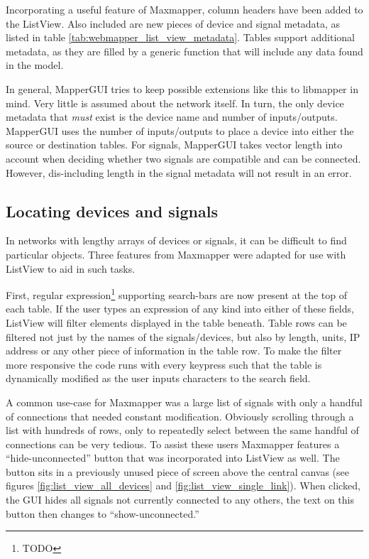 Incorporating a useful feature of Maxmapper, column headers have been added to the ListView. Also included are new pieces of device and signal metadata, as listed in table \ref{tab:webmapper_list_view_metadata}. Tables support additional metadata, as they are filled by a generic function that will include any data found in the model. 

In general, MapperGUI tries to keep possible extensions like this to libmapper in mind. Very little is assumed about the network itself. In turn, the only device metadata that \emph{must} exist is the device name and number of inputs/outputs. MapperGUI uses the number of inputs/outputs to place a device into either the source or destination tables. For signals, MapperGUI takes vector length into account when deciding whether two signals are compatible and can be connected. However, dis-including length in the signal metadata will not result in an error.
	

	\subsection{Locating devices and signals} %
	\label{sub:locating_devices_and_signals}

In networks with lengthy arrays of devices or signals, it can be difficult to find particular objects. Three features from Maxmapper were adapted for use with ListView to aid in such tasks.

First, regular expression\footnote{TODO} supporting search-bars are now present at the top of each table. If the user types an expression of any kind into either of these fields, ListView will filter elements displayed in the table beneath. Table rows can be filtered not just by the names of the signals/devices, but also by length, units, IP address or any other piece of information in the table row. To make the filter more responsive the code runs with every keypress such that the table is dynamically modified as the user inputs characters to the search field. 

A common use-case for Maxmapper was a large list of signals with only a handful of connections that needed constant modification. Obviously scrolling through a list with hundreds of rows, only to repeatedly select between the same handful of connections can be very tedious. To assist these users Maxmapper features a ``hide-unconnected'' button that was incorporated into ListView as well. The button sits in a previously unused piece of screen above the central canvas (see figures \ref{fig:list_view_all_devices} and \ref{fig:list_view_single_link}). When clicked, the GUI hides all signals not currently connected to any others, the text on this button then changes to ``show-unconnected.''


